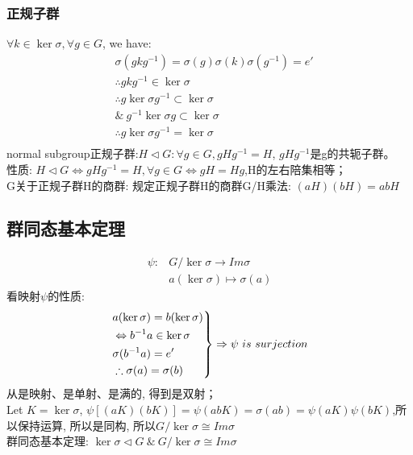 \documentclass[UTF8]{../../09-Mathematics}
\begin{document}
\subsubsection{正规子群}
$ \forall k \in \ker \sigma, \forall g\in G$, we have:
\begin{equation}
\begin{split}
&\sigma(gkg^{-1})=\sigma(g)\sigma(k)\sigma(g^{-1})=e'\\
& \therefore gkg^{-1}\in \ker \sigma\\
& \therefore g \ker \sigma g^{-1} \subset \ker \sigma\\
& \& \ g^{-1}  \ker \sigma g\subset \ker \sigma\\
& \therefore g \ker \sigma g^{-1}=\ker \sigma\\
\end{split}
\end{equation}
normal subgroup正规子群:$H \lhd G :\forall g \in G, gHg^{-1}=H$, $gHg^{-1}$是g的共轭子群。\\
性质: $H \lhd G \Leftrightarrow gHg^{-1}=H,\forall g \in G \Leftrightarrow gH=Hg$,H的左右陪集相等；\\
G关于正规子群H的商群: 规定正规子群H的商群G/H乘法: $(aH)(bH)=abH$\\
\subsection{群同态基本定理}
\begin{equation}
\begin{split}
\psi : &G/ \ker \sigma \to Im \sigma\\
& a (\ker \sigma) \mapsto \sigma(a)
\end{split}
\end{equation}
看映射$\psi$的性质: 
\begin{equation}
\label{证明同构1}
\left.
\begin{aligned}
& a(\ker \sigma)=b(\ker \sigma)\\
& \Leftrightarrow b^{-1}a \in \ker \sigma\\
&\sigma(b^{-1}a)=e'\\
&\therefore \sigma(a)=\sigma(b)
\end{aligned}
\right\} \Rightarrow \psi \ is \ surjection\\
\end{equation}
从是映射、是单射、是满的, 得到是双射；\\
Let $K=\ker \sigma$, $\psi [(aK)(bK)]=\psi (abK)=\sigma(ab)=\psi(aK)\psi(bK)$,所以保持运算, 所以是同构, 所以$G/ \ker \sigma \cong Im \sigma$\\
群同态基本定理: $\ker \sigma \lhd G \ \& \   G/ \ker \sigma \cong Im \sigma  $ 
\end{document}
